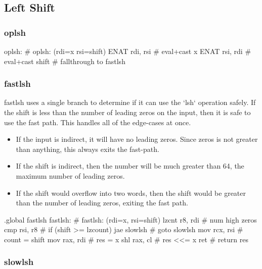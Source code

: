 \subsection{Left Shift}

\subsubsection{oplsh}

\begin{asm}
oplsh:                                      # oplsh: (rdi=x rsi=shift)
	ENAT	rdi, rsi                    #   eval+cast x
	ENAT	rsi, rdi                    #   eval+cast shift
	# fallthrough to fastlsh
\end{asm}

\subsubsection{fastlsh}

fastlsh uses a single branch to determine if it can use the `lsh`
operation safely.  If the shift is less than the number of leading zeros
on the input, then it is safe to use the fast path.  This handles all
of the edge-cases at once.

\begin{itemize}
\item
    If the input is indirect, it will have no leading zeros.  Since zeros
    is not greater than anything, this always exits the fast-path.
\item
    If the shift is indirect, then the number will be much greater than
    64, the maximum number of leading zeros.
\item
    If the shift would overflow into two words, then the shift would be
    greater than the number of leading zeros, exiting the fast path.
\end{itemize}

\begin{asm}
.global fastlsh
fastlsh:                                    # fastlsh: (rdi=x, rsi=shift)
	lzcnt	r8, rdi                     #   num high zeros
	cmp	rsi, r8                     #   if (shift >= lzcount)
	jae	slowlsh                     #     goto slowlsh
	mov	rcx, rsi                    #   count = shift
	mov	rax, rdi                    #   res = x
	shl	rax, cl                     #   res <<= x
	ret                                 #   return res
\end{asm}

\subsubsection{slowlsh}

